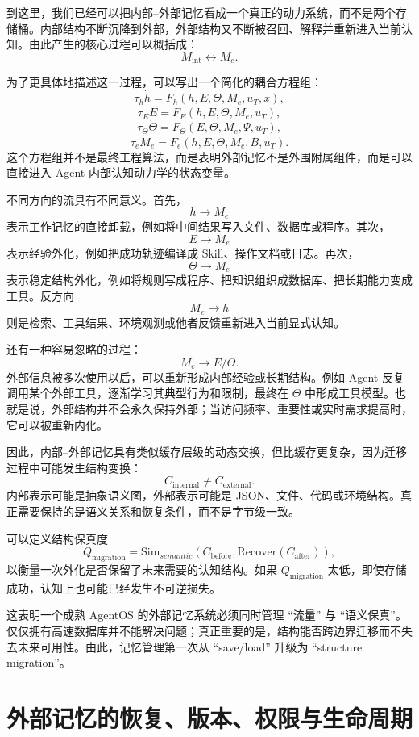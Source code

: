 到这里，我们已经可以把内部--外部记忆看成一个真正的动力系统，而不是两个存储桶。内部结构不断沉降到外部，外部结构又不断被召回、解释并重新进入当前认知。由此产生的核心过程可以概括成：
\[
M_{\mathrm{int}}
\leftrightarrow
M_e.
\]

为了更具体地描述这一过程，可以写出一个简化的耦合方程组：
\[
\tau_h\dot h
=
F_h(h,E,\Theta,M_e,u_T,x),
\]
\[
\tau_E\dot E
=
F_E(h,E,\Theta,M_e,u_T),
\]
\[
\tau_\Theta\dot\Theta
=
F_\Theta(E,\Theta,M_e,\Psi,u_T),
\]
\[
\tau_e\dot M_e
=
F_e(h,E,\Theta,M_e,B,u_T).
\]
这个方程组并不是最终工程算法，而是表明外部记忆不是外围附属组件，而是可以直接进入 Agent 内部认知动力学的状态变量。

不同方向的流具有不同意义。首先，
\[
h\rightarrow M_e
\]
表示工作记忆的直接卸载，例如将中间结果写入文件、数据库或程序。其次，
\[
E\rightarrow M_e
\]
表示经验外化，例如把成功轨迹编译成 Skill、操作文档或日志。再次，
\[
\Theta\rightarrow M_e
\]
表示稳定结构外化，例如将规则写成程序、把知识组织成数据库、把长期能力变成工具。反方向
\[
M_e\rightarrow h
\]
则是检索、工具结果、环境观测或他者反馈重新进入当前显式认知。

还有一种容易忽略的过程：
\[
M_e\rightarrow E/\Theta.
\]
外部信息被多次使用以后，可以重新形成内部经验或长期结构。例如 Agent 反复调用某个外部工具，逐渐学习其典型行为和限制，最终在 \(\Theta\) 中形成工具模型。也就是说，外部结构并不会永久保持外部；当访问频率、重要性或实时需求提高时，它可以被重新内化。

因此，内部--外部记忆具有类似缓存层级的动态交换，但比缓存更复杂，因为迁移过程中可能发生结构变换：
\[
C_{\mathrm{internal}}
\not\equiv
C_{\mathrm{external}}.
\]
内部表示可能是抽象语义图，外部表示可能是 JSON、文件、代码或环境结构。真正需要保持的是语义关系和恢复条件，而不是字节级一致。

可以定义结构保真度
\[
Q_{\mathrm{migration}}
=
\mathrm{Sim}_{semantic}
(
C_{\mathrm{before}},
\mathrm{Recover}(C_{\mathrm{after}})
),
\]
以衡量一次外化是否保留了未来需要的认知结构。如果 \(Q_{\mathrm{migration}}\) 太低，即使存储成功，认知上也可能已经发生不可逆损失。

这表明一个成熟 AgentOS 的外部记忆系统必须同时管理 ``流量'' 与 ``语义保真''。仅仅拥有高速数据库并不能解决问题；真正重要的是，结构能否跨边界迁移而不失去未来可用性。由此，记忆管理第一次从 ``save/load'' 升级为 ``structure migration''。

\section{外部记忆的恢复、版本、权限与生命周期}

